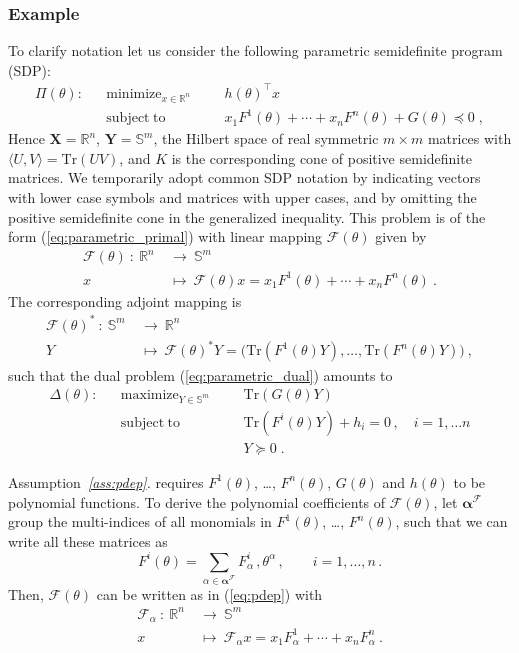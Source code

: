 \documentclass{article}
\DeclareMathOperator*{\minimize}{minimize}
\DeclareMathOperator*{\maximize}{maximize}
\DeclareMathOperator*{\subj}{subject\;to}
\newcommand{\R}{\mathbb{R}}         %
\renewcommand{\S}{\mathbb{S}}       %
\newcommand{\Tr}{\mathrm{Tr}}       %
\renewcommand{\t}{\intercal}        %
\newcommand{\adj}{\ast}                     %
\newcommand{\ppar}{\theta}                          %
\newcommand{\X}{\mathbf{X}}                         %
\newcommand{\Y}{\mathbf{Y}}                         %
\newcommand{\calF}{\mathcal{F}}                     %
\newcommand{\Alpha}{\bm{\alpha}}    %
\begin{document}
\subsubsection{Example}

To clarify notation let us consider the following parametric semidefinite program (SDP):
\[ \begin{aligned}
\Pi(\ppar): && \minimize_{x\in\R^n} &&& h(\ppar)^\t x \\
            && \subj                &&& x_1F^1(\ppar) + \cdots + x_nF^n(\ppar) + G(\ppar) \preceq 0 \;,%
\end{aligned} \]
Hence $\X = \R^n$, $\Y=\S^m$, the Hilbert space of real symmetric $m\times m$ matrices with $\langle U,V\rangle=\Tr(UV)$, and $K$ is the corresponding cone of positive semidefinite matrices. We temporarily adopt common SDP notation by indicating vectors with lower case symbols and matrices with upper cases, and by omitting the positive semidefinite cone in the generalized inequality. This problem is of the form (\ref{eq:parametric_primal}) with linear mapping $\calF(\ppar)$ given by
\begin{align*}
\calF(\ppar) ~:~ \R^n~ &\rightarrow~ \S^m \\
                  x~ &\mapsto~ \calF(\ppar)x = x_1F^1(\ppar) + \cdots + x_nF^n(\ppar) ~.%
\end{align*}
The corresponding adjoint mapping is
\begin{align*}
\calF(\ppar)^\adj ~:~ \S^m~ &\rightarrow~ \R^n\\
                      Y~ &\mapsto~ \calF(\ppar)^\adj Y = \big(\Tr(F^1(\ppar)Y), \ldots, \Tr(F^n(\ppar)Y)\big) ~,%
\end{align*}
such that the dual problem (\ref{eq:parametric_dual}) amounts to
\[ \begin{aligned}
\Delta(\ppar): && \maximize_{Y\in\S^m} &&& \Tr(G(\ppar)Y) \\
               && \subj                &&& \Tr(F^i(\ppar)Y) + h_i = 0\,,\quad i=1,\ldots n \\%
               &&                      &&& Y \succeq 0 \;.
\end{aligned} \]

Assumption~{\it{}\ref{ass:pdep}.} requires $F^1(\ppar)$, \ldots, $F^n(\ppar)$, $G(\ppar)$ and $h(\ppar)$ to be polynomial functions. To derive the polynomial coefficients of $\calF(\ppar)$, let $\Alpha^\calF$ group the multi-indices of all monomials in $F^1(\ppar)$, \ldots, $F^n(\ppar)$, such that we can write all these matrices as
\[  F^i(\ppar) = \sum_{\alpha\in\Alpha^\calF} F^i_\alpha \,, \ppar^\alpha\,,\qquad i=1,\ldots,n\,.%
\]
Then, $\calF(\ppar)$ can be written as in (\ref{eq:pdep}) with
\begin{align*}
\calF_\alpha ~:~ \R^n~ &\rightarrow~ \S^m \\
                    x~ &\mapsto~ \calF_\alpha x = x_1F^1_\alpha + \cdots + x_nF^n_\alpha ~.%
\end{align*}
\end{document}
